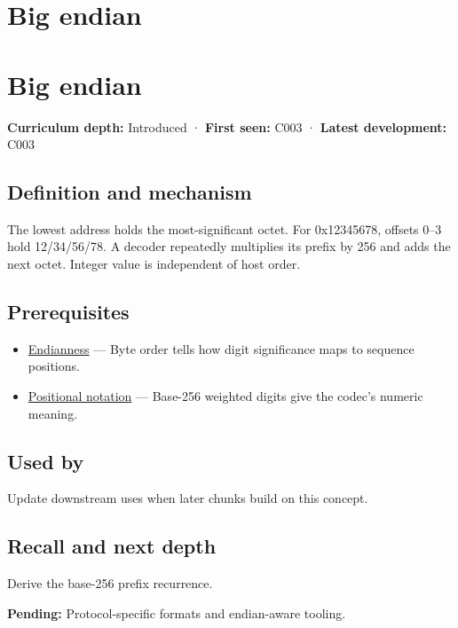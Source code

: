 \hypertarget{appendix-92e040df969a}{}
\section*{Big endian}
\section{Big endian}\label{big-endian}

\textbf{Curriculum depth:} Introduced · \textbf{First seen:} C003 · \textbf{Latest development:} C003

\subsection{Definition and mechanism}\label{definition-and-mechanism}

The lowest address holds the most-significant octet. For 0x12345678, offsets 0--3 hold 12/34/56/78. A decoder repeatedly multiplies its prefix by 256 and adds the next octet. Integer value is independent of host order.

\subsection{Prerequisites}\label{prerequisites}

\begin{itemize}
\tightlist
\item
  \hyperref[appendix-bc07c3d25b18]{Endianness} --- Byte order tells how digit significance maps to sequence positions.
\item
  \hyperref[appendix-83c3f28f7bda]{Positional notation} --- Base-256 weighted digits give the codec's numeric meaning.
\end{itemize}

\subsection{Used by}\label{used-by}

Update downstream uses when later chunks build on this concept.

\subsection{Recall and next depth}\label{recall-and-next-depth}

Derive the base-256 prefix recurrence.

\textbf{Pending:} Protocol-specific formats and endian-aware tooling.


